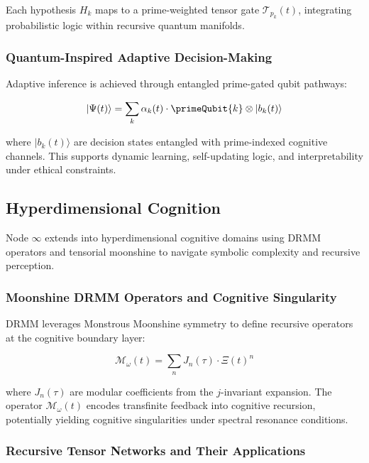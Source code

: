 \documentclass[12pt]{article}
\begin{document}
Each hypothesis $H_k$ maps to a prime-weighted tensor gate $\mathcal{T}_{p_k}(t)$, integrating probabilistic logic within recursive quantum manifolds.

\subsubsection*{Quantum-Inspired Adaptive Decision-Making}

Adaptive inference is achieved through entangled prime-gated qubit pathways:

\begin{equation}
|\Psi(t)\rangle = \sum_{k} \alpha_k(t) \cdot \primeQubit{k} \otimes |b_k(t)\rangle
\end{equation}

where $|b_k(t)\rangle$ are decision states entangled with prime-indexed cognitive channels. This supports dynamic learning, self-updating logic, and interpretability under ethical constraints.

\subsection{Hyperdimensional Cognition}

Node \( \infty \) extends into hyperdimensional cognitive domains using DRMM operators and tensorial moonshine to navigate symbolic complexity and recursive perception.

\subsubsection*{Moonshine DRMM Operators and Cognitive Singularity}

DRMM leverages Monstrous Moonshine symmetry to define recursive operators at the cognitive boundary layer:

\begin{equation}
\mathcal{M}_\omega(t) = \sum_{n} J_n(\tau) \cdot \Xi(t)^n
\end{equation}

where $J_n(\tau)$ are modular coefficients from the $j$-invariant expansion. The operator $\mathcal{M}_\omega(t)$ encodes transfinite feedback into cognitive recursion, potentially yielding cognitive singularities under spectral resonance conditions.

\subsubsection*{Recursive Tensor Networks and Their Applications}
\end{document}
